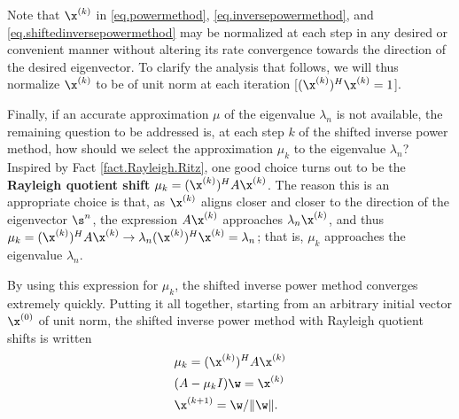 \begin{figure*}[t]

\end{figure*}


Note that $\x^{(k)}$ in \eqref{eq.powermethod}, \eqref{eq.inversepowermethod}, and \eqref{eq.shiftedinversepowermethod} may be normalized at each step in any desired or convenient manner without
altering its rate convergence towards the direction of the desired eigenvector.  To clarify the analysis that follows, we will thus normalize
$\x^{(k)}$ to be of unit norm at each iteration [$(\x^{(k)})^H \x^{(k)}=1$].

Finally, if an accurate approximation $\mu$ of the eigenvalue $\lambda_{n}$ is not available, the remaining question to be addressed is,
at each step $k$ of the shifted inverse power method, how should we select the approximation $\mu_k$ to the eigenvalue $\lambda_{n}$?
Inspired by Fact \ref{fact.Rayleigh.Ritz}, one good choice turns out to be the {\bf Rayleigh quotient shift} $\mu_k = (\x^{(k)})^H A \x^{(k)}$.
The reason this is an appropriate choice is that, as $\x^{(k)}$ aligns closer and closer to the direction of the eigenvector $\s^n$, the expression $A \x^{(k)}$
approaches $\lambda_n \x^{(k)}$, and thus $\mu_k = (\x^{(k)})^H A \x^{(k)}\rightarrow \lambda_n (\x^{(k)})^H \x^{(k)} =  \lambda_n$; that is, $\mu_k$ approaches
the eigenvalue $\lambda_n$.  

By using this expression for $\mu_k$, the shifted inverse power method converges extremely quickly.
Putting it all together, starting from an arbitrary initial vector $\x^{(0)}$ of unit norm,
the shifted inverse power method with Rayleigh quotient shifts is written
\begin{equation}
\begin{aligned}
&\mu_k = (\x^{(k)})^H A \x^{(k)}  \\
&(A-\mu_k I)\w=\x^{(k)} \\
&\x^{(k+1)}=\w/\Vert \w \Vert.
\end{aligned}
\label{shiftedinversepower}
\end{equation}
\clearpage

